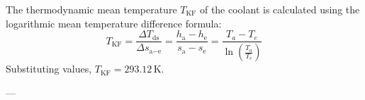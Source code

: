 The thermodynamic mean temperature \( T_{\text{KF}} \) of the coolant is calculated using the logarithmic mean temperature difference formula:  
\[
T_{\text{KF}} = \frac{\Delta T_{\text{ds}}}{\Delta s_{\text{a} - \text{e}}} = \frac{h_{\text{a}} - h_{\text{e}}}{s_{\text{a}} - s_{\text{e}}} = \frac{T_a - T_e}{\ln \left( \frac{T_a}{T_e} \right)}
\]  
Substituting values, \( T_{\text{KF}} = 293.12 \, \text{K} \).  

---